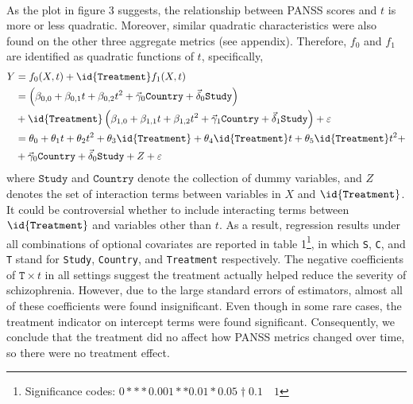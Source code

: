 \documentclass[11pt]{article}
\begin{document}
	\paragraph{} As the plot in figure 3 suggests, the relationship between PANSS scores and $t$ is more or less quadratic. Moreover, similar quadratic characteristics were also found on the other three aggregate metrics (see appendix). Therefore, $f_0$ and $f_1$ are identified as quadratic functions of $t$, specifically,
	\begin{align}
		Y &= f_0(X, t) + \id{\texttt{Treatment}} f_1(X, t) \\
		&= \left(\beta_{0, 0} + \beta_{0, 1} t + \beta_{0, 2} t^2 + \vec{\gamma}_0 \texttt{Country} + \vec{\delta}_0 \texttt{Study}\right) \\
		&+ \id{\texttt{Treatment}} \left(\beta_{1, 0} + \beta_{1, 1} t + \beta_{1, 2} t^2 + \vec{\gamma}_1 \texttt{Country} + \vec{\delta}_1 \texttt{Study}\right) + \varepsilon \\
		&= \theta_0 + \theta_1 t + \theta_2 t^2 + \theta_3 \id{\texttt{Treatment}} + \theta_4 \id{\texttt{Treatment}} t + \theta_5 \id{\texttt{Treatment}} t^2 + \\
		&+\vec{\gamma}_0 \texttt{Country} + \vec{\delta}_0 \texttt{Study} + Z + \varepsilon
	\end{align}
	where $\texttt{Study}$ and $\texttt{Country}$ denote the collection of dummy variables, and $Z$ denotes the set of interaction terms between variables in $X$ and $\id{\texttt{Treatment}}$. It could be controversial whether to include interacting terms between $\id{\texttt{Treatment}}$ and variables other than $t$. As a result, regression results under all combinations of optional covariates are reported in table 1\footnote{Significance codes:  $0 *** 0.001 ** 0.01 * 0.05 \dagger 0.1 \quad 1$}, in which \texttt{S}, \texttt{C}, and \texttt{T} stand for \texttt{Study}, \texttt{Country}, and \texttt{Treatment} respectively. The negative coefficients of $\texttt{T} \times t$ in all settings suggest the treatment actually helped reduce the severity of schizophrenia. However, due to the large standard errors of estimators, almost all of these coefficients were found insignificant. Even though in some rare cases, the treatment indicator on intercept terms were found significant. Consequently, we conclude that the treatment did no affect how PANSS metrics changed over time, so there were no treatment effect.
\end{document}
